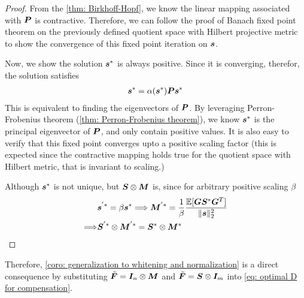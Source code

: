 \begin{proof}
From the \cref{thm: Birkhoff-Hopf}, we know the linear mapping associated with ${\bm{P}}$ is contractive. Therefore, we can follow the proof of Banach fixed point theorem on the previously defined quotient space with Hilbert projective metric to show the convergence of this fixed point iteration on ${\bm{s}}$.  

Now, we show the solution ${\bm{s}}^*$ is always positive. Since it is converging, therefor, the solution satisfies 
\begin{align*}
    {\bm{s}}^* = \alpha({\bm{s}}^*) {\bm{P}}{\bm{s}}^*
\end{align*}
This is equivalent to finding the eigenvectors of ${\bm{P}}$. By leveraging Perron-Frobenius theorem (\cref{thm: Perron-Frobenius theorem}), we know ${\bm{s}}^*$ is the principal eigenvector of ${\bm{P}}$, and only contain positive values. It is also easy to verify that this fixed point converges upto a positive scaling factor (this is expected since the contractive mapping holds true for the quotient space with Hilbert metric, that is invariant to scaling.)

Although ${\bm{s}}^*$ is not unique, but ${\bm{S}}\otimes {\bm{M}}$ is, since for arbitrary positive scaling $\beta$
\begin{align*}
    &{\bm{s}}^{'*}=\beta{\bm{s}}^* \Longrightarrow {\bm{M}}^{'*} = \frac{1}{\beta}\frac{\mathbb{E}[{\bm{G}}{\bm{S}}^*{\bm{G}}^T]}{\Vert{\bm{s}}\Vert_2^2}\\
    \Longrightarrow& {\bm{S}}^{'*}\otimes{\bm{M}}^{'*} = {\bm{S}}^*\otimes {\bm{M}}^*
\end{align*}
\end{proof}

Therefore, \cref{coro: generalization to whitening and normalization} is a direct consequence by substituting $\tilde{\bm{F}} = {\bm{I}}_n\otimes{\bm{M}}$ and $\tilde{\bm{F}} = {\bm{S}}\otimes {\bm{I}}_m$ into \cref{eq: optimal D for compensation}.


